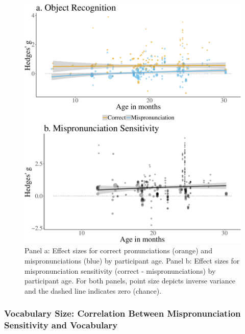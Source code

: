 \documentclass[man]{apa6}
\theoremstyle{definition}
\theoremstyle{definition}
\theoremstyle{definition}
\theoremstyle{remark}
\begin{document}
\begin{figure}
\centering
\includegraphics{Paper_Analyses_files/figure-latex/PlotMPEffect-1.pdf}
\caption{\label{fig:PlotMPEffect}Panel a: Effect sizes for correct
pronunciations (orange) and mispronunciations (blue) by participant age.
Panel b: Effect sizes for mispronunciation sensitivity (correct -
mispronunciations) by participant age. For both panels, point size
depicts inverse variance and the dashed line indicates zero (chance).}
\end{figure}

\subsubsection{Vocabulary Size: Correlation Between Mispronunciation
Sensitivity and
Vocabulary}\label{vocabulary-size-correlation-between-mispronunciation-sensitivity-and-vocabulary}
\end{document}
